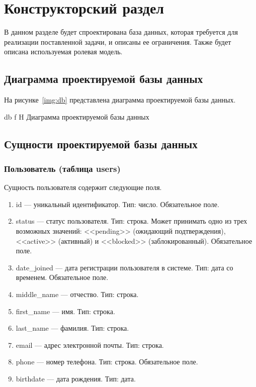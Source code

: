 \chapter{Конструкторский раздел}

В данном разделе будет спроектирована база данных, которая требуется для реализации поставленной задачи, и описаны ее ограничения. Также будет описана используемая ролевая модель.

\section{Диаграмма проектируемой базы данных}

На рисунке~\ref{img:db} представлена диаграмма проектируемой базы данных.

    {db}
    {f}
    {H}
    {\textwidth}
    {Диаграмма проектируемой базы данных}

\section{Сущности проектируемой базы данных}

\subsection{Пользователь (таблица users)}

Сущность пользователя содержит следующие поля.

\begin{enumerate}
    \item id --- уникальный идентификатор. Тип: число. Обязательное поле.
    \item status --- статус пользователя. Тип: строка. Может принимать одно из трех возможных значений: <<pending>> (ожидающий подтверждения), <<active>> (активный) и <<blocked>> (заблокированный). Обязательное поле.
    \item date\_joined --- дата регистрации пользователя в системе. Тип: дата со временем. Обязательное поле.
    \item middle\_name --- отчество. Тип: строка.
    \item first\_name --- имя. Тип: строка.
    \item last\_name --- фамилия. Тип: строка.
    \item email --- адрес электронной почты. Тип: строка.
    \item phone --- номер телефона. Тип: строка. Обязательное поле.
    \item birthdate --- дата рождения. Тип: дата.
\end{enumerate}

